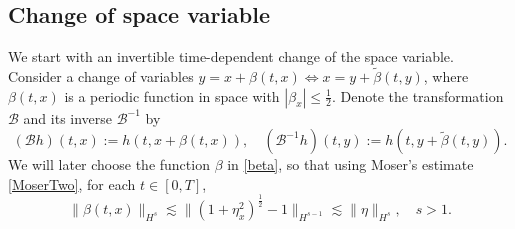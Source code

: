 \documentclass[12pt]{amsart}
\theoremstyle{remark}
\theoremstyle{definition}
\numberwithin{equation}{section}
\newcommand{\f}{\frac}
\newcommand{\mB}{\mathcal{B}}
\begin{document}
\subsection{Change of space variable}
We start with an invertible time-dependent change of the space variable.
Consider a change of variables $y = x + \beta(t,x) \Leftrightarrow  x = y + \tilde{\beta}(t,y)$, where $\beta(t,x)$ is a periodic function in space with $|\beta_x|\leq \f12$.
Denote the transformation $\mB$ and its inverse $\mB^{-1}$ by
\begin{equation} \label{BBInverseDef}
    (\mathcal{B}h)(t,x) := h(t, x+ \beta(t,x)), \quad (\mathcal{B}^{-1}h)(t,y) := h(t, y+ \tilde{\beta}(t,y)).
\end{equation}
We will later choose the function $\beta$ in \eqref{beta}, so that using Moser's estimate \eqref{MoserTwo}, for each $t\in [0,T]$,
\begin{equation} \label{BetaHsEst}
 \|\beta(t,x)\|_{H^s} \lesssim \|(1+\eta_x^2)^\f12 -1\|_{H^{s-1}} \lesssim \|\eta \|_{H^s}, \quad s>1.
\end{equation}
\end{document}
